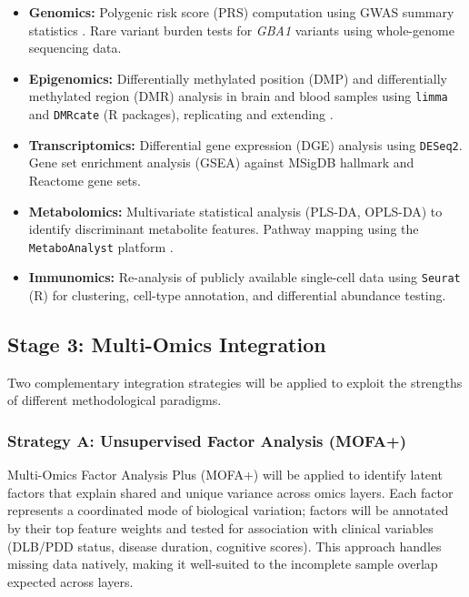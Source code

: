 \begin{itemize}
    \item \textbf{Genomics:} Polygenic risk score (PRS) computation using GWAS summary statistics \cite{chia2025gwas}. Rare variant burden tests for \textit{GBA1} variants using whole-genome sequencing data.
    \item \textbf{Epigenomics:} Differentially methylated position (DMP) and differentially methylated region (DMR) analysis in brain and blood samples using \texttt{limma} and \texttt{DMRcate} (R packages), replicating and extending \cite{nabais2024methylation}.
    \item \textbf{Transcriptomics:} Differential gene expression (DGE) analysis using \texttt{DESeq2}. Gene set enrichment analysis (GSEA) against MSigDB hallmark and Reactome gene sets.
    \item \textbf{Metabolomics:} Multivariate statistical analysis (PLS-DA, OPLS-DA) to identify discriminant metabolite features. Pathway mapping using the \texttt{MetaboAnalyst} platform \cite{frontiers2024metabolomics}.
    \item \textbf{Immunomics:} Re-analysis of publicly available single-cell data \cite{singlecell2024immune} using \texttt{Seurat} (R) for clustering, cell-type annotation, and differential abundance testing.
\end{itemize}

\subsection{Stage 3: Multi-Omics Integration}

Two complementary integration strategies will be applied to exploit the strengths of different methodological paradigms.

\subsubsection{Strategy A: Unsupervised Factor Analysis (MOFA+)}
Multi-Omics Factor Analysis Plus (MOFA+) \cite{argelaguet2020mofa} will be applied to identify latent factors that explain shared and unique variance across omics layers. Each factor represents a coordinated mode of biological variation; factors will be annotated by their top feature weights and tested for association with clinical variables (DLB/PDD status, disease duration, cognitive scores). This approach handles missing data natively, making it well-suited to the incomplete sample overlap expected across layers.

